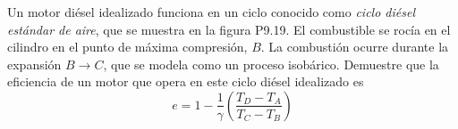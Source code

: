 \item Un motor diésel idealizado funciona en un ciclo conocido como \textit{ciclo diésel estándar de aire}, que se muestra en la figura P9.19. El combustible se rocía en el cilindro en el punto de máxima compresión, $B$. La combustión ocurre durante la expansión $B \rightarrow C$, que se modela como un proceso isobárico. Demuestre que la eficiencia de un motor que opera en este ciclo diésel idealizado es
$$ e = 1 - \frac{1}{\gamma} \left( \frac{T_D - T_A}{T_C - T_B} \right) $$
